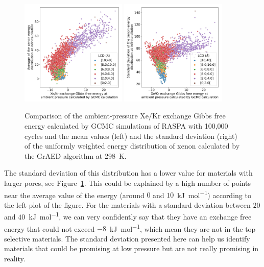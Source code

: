 \documentclass[main]{subfiles}
\begin{document}
\begin{figure}[ht]
  \centering
    \includegraphics[width=0.45\textwidth]{figures/3-fastsim/G_2080_vs_mean_grid_x_overview.jpg}
    \includegraphics[width=0.45\textwidth]{figures/3-fastsim/G_2080_vs_std_grid_x_overview.jpg}
    \caption{Comparison of the ambient-pressure Xe/Kr exchange Gibbs free energy calculated by GCMC simulations of RASPA with 100,000 cycles and the mean values (left) and the standard deviation (right) of the uniformly weighted energy distribution of xenon calculated by the GrAED algorithm at \SI{298}{\kelvin}.}\label{fgr:energy_dist_mean_std}
\end{figure}

The standard deviation of this distribution has a lower value for materials with larger pores, see Figure~\ref{fgr:energy_dist_mean_std}. This could be explained by a high number of points near the average value of the energy (around $0$ and $10$~\si{\kilo\joule\per\mole}) according to the left plot of the figure. For the materials with a standard deviation between $20$ and $40$~\si{\kilo\joule\per\mole}, we can very confidently say that they have an exchange free energy that could not exceed $-8$~\si{\kilo\joule\per\mole}, which mean they are not in the top selective materials. The standard deviation presented here can help us identify materials that could be promising at low pressure but are not really promising in reality. 
\end{document}
